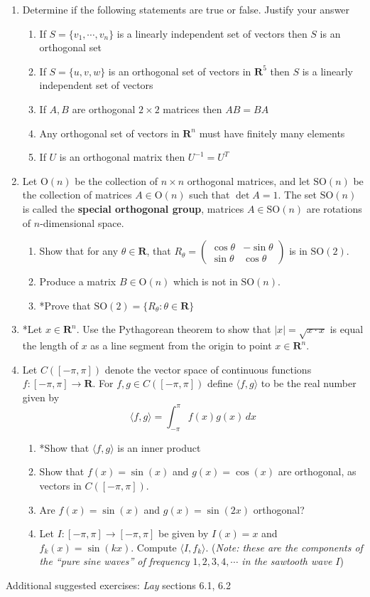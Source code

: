 \documentclass[12pt]{article}
\numberwithin{equation}{subsection}
\numberwithin{figure}{subsection}
\theoremstyle{note}
\newcommand{\R}{\mathbf{R}}
\newcommand\On[1]{\mathrm{O}(#1)}
\newcommand\SO[1]{\mathrm{SO}(#1)}
\newcommand\ip[2]{\langle #1, #2\rangle}
\newcommand\m[1]{\begin{pmatrix}#1\end{pmatrix}}
\begin{document}
\begin{enumerate}[label=\arabic*.]
\item Determine if the following statements are true or false. Justify your answer
\begin{enumerate}
	\item If $S=\{v_1,\cdots,v_n\}$ is a linearly independent set of vectors then $S$ is an orthogonal set
	\item If $S=\{u,v,w\}$ is an orthogonal set of vectors in $\R^5$ then $S$ is a linearly independent set of vectors
	\item If $A,B$ are orthogonal $2\times 2$ matrices then $AB=BA$
	\item Any orthogonal set of vectors in $\R^n$ must have finitely many elements
	\item If $U$ is an orthogonal matrix then $U^{-1}=U^T$
\end{enumerate}

\item Let $\On{n}$ be the collection of $n\times n$ orthogonal matrices, and let $\SO{n}$ be the collection of matrices $A\in \On{n}$ such that $\det A=1$. The set $\SO{n}$ is called the \textbf{special orthogonal group}, matrices $A\in\SO{n}$ are rotations of $n$-dimensional space.
\begin{enumerate}
	\item Show that for any $\theta\in \R$, that $R_{\theta}=\m{\cos\theta & -\sin\theta \\ \sin\theta & \cos \theta}$ is in $\SO{2}$. 
	\item Produce a matrix $B\in \On{n}$ which is not in $\SO{n}$.
	\item *Prove that $\SO{2}=\{R_{\theta} : \theta\in \R\}$
\end{enumerate}

\item *Let $x\in \R^n$. Use the Pythagorean theorem to show that $|x|=\sqrt{x\cdot x}$ is equal the length of $x$ as a line segment from the origin to point $x\in \R^n$. 

\item Let $C([-\pi,\pi ])$ denote the vector space of continuous functions $f\colon[-\pi,\pi ]\to\R$. For $f,g\in C([-\pi,\pi ])$ define $\ip{f}{g}$ to be the real number given by \[\ip{f}{g}= \int_{-\pi}^{\pi} f(x)g(x)\,dx\] 

\begin{enumerate}
	\item *Show that $\ip{f}{g}$ is an inner product
	\item Show that $f(x)=\sin(x)$ and $g(x)=\cos(x)$ are orthogonal, as vectors in $C([-\pi,\pi ])$.
	\item Are $f(x)=\sin(x)$ and $g(x)=\sin(2x)$ orthogonal?
	\item Let $I\colon[-\pi,\pi ]\to [-\pi,\pi ]$ be given by $I(x)=x$ and $f_k(x)=\sin(kx)$. Compute $\ip{I}{f_k}$. (\textit{Note: these are the components of the ``pure sine waves'' of frequency $1,2,3,4,\cdots$ in the sawtooth wave $I$})
\end{enumerate}

\end{enumerate}
Additional suggested exercises: \textit{Lay} sections 6.1, 6.2
\end{document}
